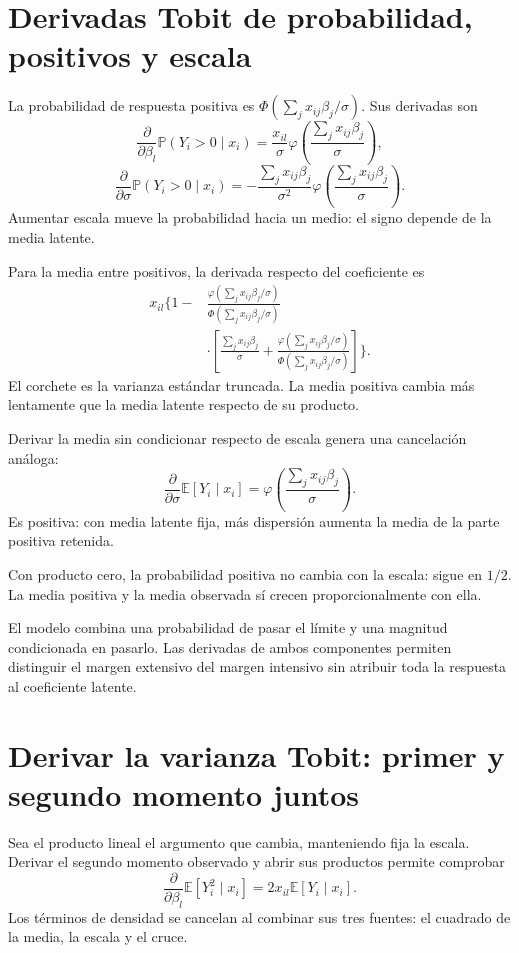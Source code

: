 \documentclass[11pt,a4paper]{article}
\newcommand{\E}{\mathbb E}
\newcommand{\Prob}{\mathbb P}
\begin{document}
\clearpage
\section{Derivadas Tobit de probabilidad, positivos y escala}\label{unidad90}
La probabilidad de respuesta positiva es
\(\Phi(\sum_jx_{ij}\beta_j/\sigma)\).
Sus derivadas son
\[
\frac{\partial}{\partial\beta_l}\Prob(Y_i>0\mid x_i)
=\frac{x_{il}}{\sigma}
\varphi\left(\frac{\sum_jx_{ij}\beta_j}{\sigma}\right),
\]
\[
\frac{\partial}{\partial\sigma}\Prob(Y_i>0\mid x_i)
=-\frac{\sum_jx_{ij}\beta_j}{\sigma^2}
\varphi\left(\frac{\sum_jx_{ij}\beta_j}{\sigma}\right).
\]
Aumentar escala mueve la probabilidad
hacia un medio: el signo depende
de la media latente.

Para la media entre positivos,
la derivada respecto del coeficiente es
\[
\begin{aligned}
x_{il}\Bigg\{1-&
\frac{\varphi(\sum_jx_{ij}\beta_j/\sigma)}
{\Phi(\sum_jx_{ij}\beta_j/\sigma)}\\
&\cdot\left[
\frac{\sum_jx_{ij}\beta_j}{\sigma}
+\frac{\varphi(\sum_jx_{ij}\beta_j/\sigma)}
{\Phi(\sum_jx_{ij}\beta_j/\sigma)}
\right]\Bigg\}.
\end{aligned}
\]
El corchete es la varianza
estándar truncada.
La media positiva cambia más
lentamente que la media latente
respecto de su producto.

Derivar la media sin condicionar
respecto de escala genera
una cancelación análoga:
\[
\frac{\partial}{\partial\sigma}\E[Y_i\mid x_i]
=\varphi\left(\frac{\sum_jx_{ij}\beta_j}{\sigma}\right).
\]
Es positiva: con media latente fija,
más dispersión aumenta la media
de la parte positiva retenida.

\begin{ejemplo}[Centro]
Con producto cero, la probabilidad positiva
no cambia con la escala: sigue en \(1/2\).
La media positiva y la media observada
sí crecen proporcionalmente con ella.
\end{ejemplo}
El modelo combina una probabilidad
de pasar el límite y una magnitud
condicionada en pasarlo.
Las derivadas de ambos componentes
permiten distinguir el margen
extensivo del margen intensivo
sin atribuir toda la respuesta
al coeficiente latente.

\clearpage
\section{Derivar la varianza Tobit: primer y segundo momento juntos}\label{unidad91}
Sea el producto lineal el argumento
que cambia, manteniendo fija la escala.
Derivar el segundo momento observado
y abrir sus productos permite comprobar
\[
\frac{\partial}{\partial\beta_l}
\E[Y_i^2\mid x_i]=2x_{il}\E[Y_i\mid x_i].
\]
Los términos de densidad se cancelan
al combinar sus tres fuentes:
el cuadrado de la media,
la escala y el cruce.
\end{document}
